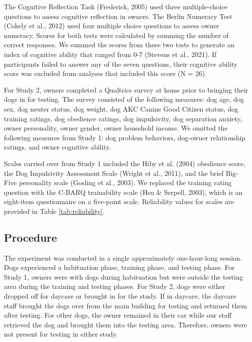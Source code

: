 \documentclass[
  pub,floatsintext]{apa6}
\begin{document}
The Cognitive Reflection Task (Frederick, 2005) used three multiple-choice questions to assess cognitive reflection in owners. The Berlin Numeracy Test (Cokely et al., 2012) used four multiple choice questions to assess owner numeracy. Scores for both tests were calculated by summing the number of correct responses. We summed the scores from these two tests to generate an index of cognitive ability that ranged from 0-7 (Stevens et al., 2021). If participants failed to answer any of the seven questions, their cognitive ability score was excluded from analyses that included this score (N = 26).

For Study 2, owners completed a Qualtrics survey at home prior to bringing their dogs in for testing. The survey consisted of the following measures: dog age, dog sex, dog neuter status, dog weight, dog AKC Canine Good Citizen status, dog training ratings, dog obedience ratings, dog impulsivity, dog separation anxiety, owner personality, owner gender, owner household income. We omitted the following measures from Study 1: dog problem behaviors, dog-owner relationship ratings, and owner cognitive ability.

Scales carried over from Study 1 included the Hiby et al. (2004) obedience score, the Dog Impulsivity Assessment Scale (Wright et al., 2011), and the brief Big-Five personality scale (Gosling et al., 2003). We replaced the training rating question with the C-BARQ trainability scale (Hsu \& Serpell, 2003), which is an eight-item questionnaire on a five-point scale. Reliability values for scales are provided in Table \ref{tab:reliability}.

\hypertarget{procedure}{%
\subsection{Procedure}\label{procedure}}

The experiment was conducted in a single approximately one-hour-long session. Dogs experienced a habituation phase, training phase, and testing phase. For Study 1, owners were with dogs during habituation but were outside the testing area during the training and testing phases. For Study 2, dogs were either dropped off for daycare or brought in for the study. If in daycare, the daycare staff brought the dogs over from the main building for testing and returned them after testing. For other dogs, the owner remained in their car while our staff retrieved the dog and brought them into the testing area. Therefore, owners were not present for testing in either study.
\end{document}
